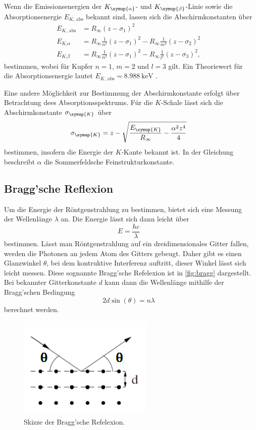Wenn die Emissionsenergien der $K_{\symup{\alpha}}$- und $K_{\symup{\beta}}$-Linie sowie die Absorptionsenergie
$E_{K\text{, abs}}$ bekannt sind, lassen sich die Abschirmkonstanten über
\begin{align}
    \label{eq:Sigma_Kupfer}
    E_{K \text{, abs}} &= R_\infty (z - \sigma_1)^2 \\
    \label{eq:Sigma_Kupfer2}
    E_{K \text{,} \alpha} &= R_\infty \frac{1}{n^2} (z - \sigma_1)^2 - R_\infty \frac{1}{m^2} (z - \sigma_2)^2 \\
    \label{eq:Sigma_Kupfer3}
    E_{K \text{,} \beta} &= R_\infty \frac{1}{n^2} (z - \sigma_1)^2 - R_\infty \frac{1}{l^2} (z - \sigma_3)^2, 
\end{align}
bestimmen, wobei für Kupfer $n = 1$, $m = 2$ und $l = 3$ gilt.
Ein Theoriewert für die Absorptionsenergie lautet $E_{K\text{, abs}}=\qty{8,988}{\kilo\electronvolt}$ \cite{Ekabs}.

Eine andere Möglichkeit zur Bestimmung der Abschirmkonstante erfolgt über Betrachtung dees Absorptionsspektrums.
Für die $K$-Schale lässt sich die Abschirmkonstante $\sigma_{\symup{K}}$ über
\begin{equation}
    \label{eq:sigma_K}
    \sigma_{\symup{K}} = z - \sqrt{\frac{E_{\symup{K}}}{R_\infty} - \frac{\alpha^2 z^4}{4}}
\end{equation}
bestimmen, insofern die Energie der $K$-Kante bekannt ist.
In der Gleichung beschreibt $\alpha$ die Sommerfeldsche Feinstrukturkonstante.

\subsection{Bragg'sche Reflexion}
\label{sec:Bragg'sche Reflexion}

Um die Energie der Röntgenstrahlung zu bestimmen, bietet sich eine Messung der Wellenlänge $\lambda$ an.
Die Energie lässt sich dann leicht über
\begin{equation}
    \label{eq:Energie}
    E=\frac{hc}{\lambda}
\end{equation}
bestimmen.
Lässt man Röntgenstrahlung auf ein dreidimensionales Gitter fallen, werden die Photonen an jedem Atom des Gitters gebeugt.
Daher gibt es einen Glanzwinkel $\theta$, bei dem kontruktive Interferenz auftritt, dieser Winkel lässt sich leicht messen.
Diese sognannte Bragg'sche Refelexion ist in \autoref{fig:bragg} dargestellt.
Bei bekannter Gitterkonstante $d$ kann dann die Wellenlänge mithilfe der Bragg'schen Bedingung
\begin{equation}
    \label{eq:Bragg}
    2d\sin(\theta)=n\lambda
\end{equation}
berechnet werden.

\begin{figure}[H]
    \centering
    \includegraphics[height=5cm]{content/pics/bragg.pdf}
    \caption{Skizze der Bragg'sche Refelexion.\cite{v602}}
    \label{fig:bragg}
\end{figure}
